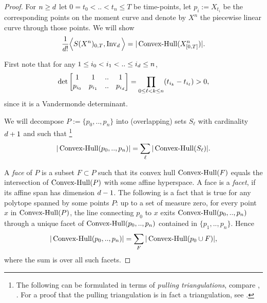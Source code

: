 \begin{proof}
  For $n\ge d$ let $0 = t_0 <  .. < t_n \le T$ be time-points, let $p_i := X_{t_i}$ be
  the corresponding points on the moment curve
  and denote by $X^n$ the piecewise linear curve through those points.
  We will show
  \begin{align*}
    \frac{1}{d !} \Big\langle S(X^n)_{0,T}, \operatorname{Inv}_{d} \Big\rangle
    =
    |\operatorname{Convex-Hull}( X^n_{[0,T]} )|.
  \end{align*}

  First note that for any $1 \le i_0 < i_1 < .. \le i_d \le n$,
  \begin{align}
    \label{eq:positiveDeterminant}
    \det\left[
      \begin{matrix}
        1 & 1 & .. & 1 \\
        p_{i_0} & p_{i_1} & .. & p_{i_d}
      \end{matrix}
    \right]
    =
    \prod_{0\le \ell < k \le n} ( t_{i_k} - t_{i_\ell} ) > 0,
  \end{align}
  since it is a Vandermonde determinant.

  We will decompose $P := \{p_0,..,p_n\}$ into (overlapping) sets $S_\ell$ with cardinality $d+1$ and such that%
  \footnote{The following can be formulated in terms of \emph{pulling triangulations}, compare \cite[Chapter 16]{Handbook}, \cite{Lee1991}.
  For a proof that the pulling triangulation is in fact a triangulation, see \cite[Proposition 8.6]{Sturmfels}.}
  \begin{align*}
    |\operatorname{Convex-Hull}( p_0,..,p_n )|
    =
    \sum_\ell |\operatorname{Convex-Hull}( S_\ell )|.
  \end{align*}

  A \emph{face} of $P$ is a subset $F \subset P$ such that its convex hull $\operatorname{Convex-Hull}( F )$
  equals the intersection of $\operatorname{Convex-Hull}(P)$ with some affine hyperspace.
  A face is a \emph{facet}, if its affine span has dimension $d-1$.
  The following is a fact that is true for any polytope spanned by some points $P$:
  up to a set of measure zero, for every point $x$ in $\operatorname{Convex-Hull}( P )$,
  the line connecting $p_0$ to $x$ exits $\operatorname{Convex-Hull}(p_0,..,p_n)$ through a unique facet of $\operatorname{Convex-Hull}( p_0,..,p_n )$ contained in $\{ p_1, .., p_n \}$.
  Hence
  \begin{align*}
    |\operatorname{Convex-Hull}( p_0,..,p_n )|
    =
    \sum_F |\operatorname{Convex-Hull}( p_0 \cup F )|,
  \end{align*}
  where the sum is over all such facets.


\end{proof}
